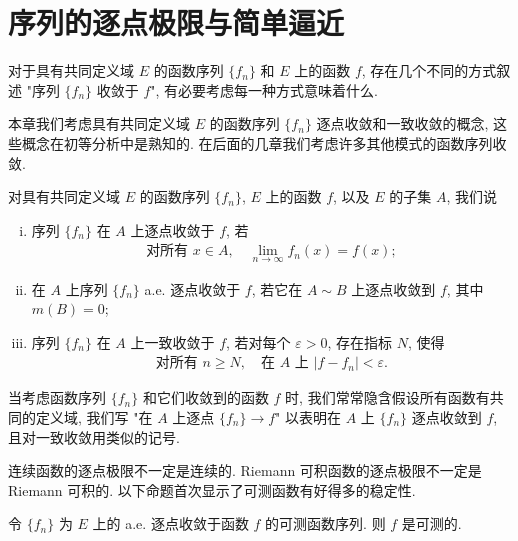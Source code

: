 \documentclass[../../main.tex]{subfiles}
\begin{document}
\section{序列的逐点极限与简单逼近}\label{section:ch03-逐点极限简单逼近}

对于具有共同定义域 $E$ 的函数序列 $\{f_{n}\}$ 和 $E$ 上的函数 $f$, 存在几个不同的方式叙述 "序列 $\{f_{n}\}$ 收敛于 $f$", 有必要考虑每一种方式意味着什么.

本章我们考虑具有共同定义域 $E$ 的函数序列 $\{f_{n}\}$ 逐点收敛和一致收敛的概念, 这些概念在初等分析中是熟知的. 在后面的几章我们考虑许多其他模式的函数序列收敛.

\begin{definition}\label{definition:ch03-收敛方式}
对具有共同定义域 $E$ 的函数序列 $\{f_{n}\}$, $E$ 上的函数 $f$, 以及 $E$ 的子集 $A$, 我们说
\begin{enumerate}[(i)]
\item 序列 $\{f_{n}\}$ 在 $A$ 上逐点收敛于 $f$, 若
\begin{align*}
\text{对所有 }x\in A,\quad\lim_{n\to\infty}f_{n}(x)=f(x);
\end{align*}
\item 在 $A$ 上序列 $\{f_{n}\}$ a.e. 逐点收敛于 $f$, 若它在 $A\sim B$ 上逐点收敛到 $f$, 其中 $m(B)=0$;
\item 序列 $\{f_{n}\}$ 在 $A$ 上一致收敛于 $f$, 若对每个 $\varepsilon>0$, 存在指标 $N$, 使得
\begin{align*}
\text{对所有 }n\geqslant N,\quad\text{在 }A\text{ 上 }|f-f_{n}|<\varepsilon.
\end{align*}
\end{enumerate}
\end{definition}

当考虑函数序列 $\{f_{n}\}$ 和它们收敛到的函数 $f$ 时, 我们常常隐含假设所有函数有共同的定义域, 我们写 "在 $A$ 上逐点 $\{f_{n}\}\to f$" 以表明在 $A$ 上 $\{f_{n}\}$ 逐点收敛到 $f$, 且对一致收敛用类似的记号.

连续函数的逐点极限不一定是连续的. Riemann 可积函数的逐点极限不一定是 Riemann 可积的. 以下命题首次显示了可测函数有好得多的稳定性.

\begin{proposition}\label{proposition:ch03-逐点极限可测}
令 $\{f_{n}\}$ 为 $E$ 上的 a.e. 逐点收敛于函数 $f$ 的可测函数序列. 则 $f$ 是可测的.
\end{proposition}
\end{document}
